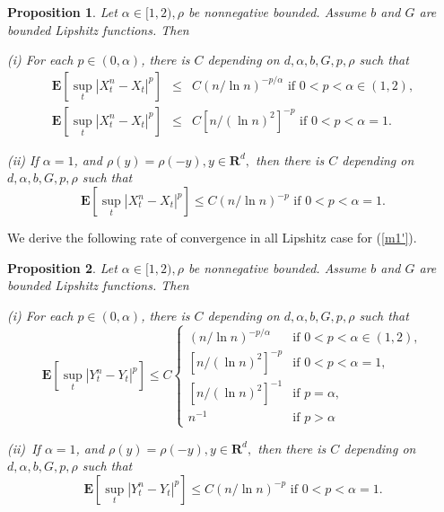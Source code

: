 \documentclass[11pt]{amsart}
\theoremstyle{plain}
\newtheorem{proposition}{Proposition}
\numberwithin{equation}{section}
\begin{document}
\begin{proposition}
\label{pro3}Let $\alpha \in \lbrack 1,2),\rho $ be nonnegative bounded.
Assume $b$ and $G$ are bounded Lipshitz functions. Then

(i) For each $p\in \left( 0,\alpha \right) $, there is $C$ depending on $d,\alpha ,b,G,p,\rho $ such that\begin{eqnarray*}
\mathbf{E}\left[ \sup_{t}\left\vert X_{t}^{n}-X_{t}\right\vert ^{p}\right]
&\leq &C\left( n/\ln n\right) ^{-p/\alpha }\text{ if }0<p<\alpha \in \left(
1,2\right) , \\
\mathbf{E}\left[ \sup_{t}\left\vert X_{t}^{n}-X_{t}\right\vert ^{p}\right]
&\leq &C\left[ n/\left( \ln n\right) ^{2}\right] ^{-p}\text{ if }0<p<\alpha
=1.
\end{eqnarray*}

(ii) If $\alpha =1$, and $\rho \left( y\right) =\rho \left( -y\right) ,y\in 
\mathbf{R}^{d},$ then there is $C$ depending on $d,\alpha ,b,G,p,\rho $ such
that\begin{equation*}
\mathbf{E}\left[ \sup_{t}\left\vert X_{t}^{n}-X_{t}\right\vert ^{p}\right]
\leq C\left( n/\ln n\right) ^{-p}\text{ if }0<p<\alpha =1.
\end{equation*}
\end{proposition}

We derive the following rate of convergence in all Lipshitz case for (\ref{m1'}).

\begin{proposition}
\label{pro4}Let $\alpha \in \lbrack 1,2),\rho $ be nonnegative bounded.
Assume $b$ and $G$ are bounded Lipshitz functions. Then

(i) For each $p\in \left( 0,\alpha \right) $, there is $C$ depending on $d,\alpha ,b,G,p,\rho $ such that\begin{equation*}
\mathbf{E}\left[ \sup_{t}\left\vert Y_{t}^{n}-Y_{t}\right\vert ^{p}\right]
\leq C\left\{ 
\begin{array}{ll}
\left( n/\ln n\right) ^{-p/\alpha } & \text{if }0<p<\alpha \in \left(
1,2\right) , \\ 
\left[ n/\left( \ln n\right) ^{2}\right] ^{-p} & \text{if }0<p<\alpha =1, \\ 
\left[ n/\left( \ln n\right) ^{2}\right] ^{-1} & \text{if }p=\alpha , \\ 
n^{-1} & \text{if }p>\alpha\end{array}\right.
\end{equation*}

(ii)\ If $\alpha =1$, and $\rho \left( y\right) =\rho \left( -y\right) ,y\in 
\mathbf{R}^{d},$ then there is $C$ depending on $d,\alpha ,b,G,p,\rho $ such
that\begin{equation*}
\mathbf{E}\left[ \sup_{t}\left\vert Y_{t}^{n}-Y_{t}\right\vert ^{p}\right]
\leq C\left( n/\ln n\right) ^{-p}\text{ if }0<p<\alpha =1.
\end{equation*}
\end{proposition}
\end{document}
